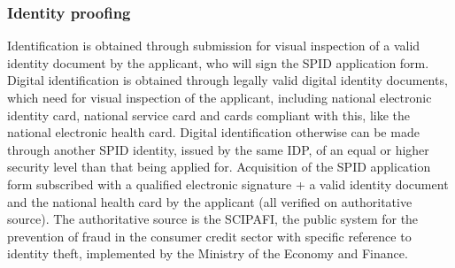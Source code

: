 \documentclass[a4paper, 10pt, titlepage]{article}
\begin{document}
\subsubsection{Identity proofing}
Identification is obtained through submission for visual inspection of a valid identity document by the applicant, who will sign the SPID application form. Digital identification is obtained through legally valid digital identity documents, which need for visual inspection of the applicant, including national electronic identity card, national service card and cards compliant with this, like the national electronic health card. Digital identification otherwise can be made through another SPID identity, issued by the same IDP, of an equal or higher security level than that being applied for.
Acquisition of the SPID application form subscribed with a qualified electronic signature + a valid identity document and the national health card by the applicant (all verified on authoritative source). The authoritative source is the SCIPAFI, the public system for the prevention of fraud in the consumer credit sector with specific reference to identity theft, implemented by the Ministry of the Economy and Finance.
\end{document}
